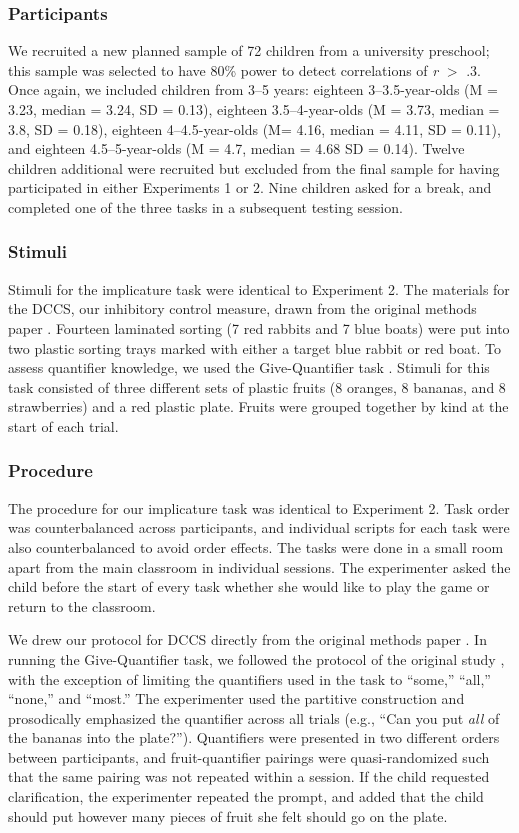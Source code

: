 \documentclass[man]{apa2}
\begin{document}
\subsubsection{Participants} We recruited a new planned sample of 72 children from a university preschool; this sample was selected to have 80\% power to detect correlations of \emph{r} $>$ .3. Once again, we included children from 3--5 years: eighteen 3--3.5-year-olds (M = 3.23, median = 3.24, SD = 0.13), eighteen 3.5--4-year-olds (M = 3.73, median = 3.8, SD = 0.18), eighteen 4--4.5-year-olds (M= 4.16, median = 4.11, SD = 0.11), and eighteen 4.5--5-year-olds (M = 4.7, median = 4.68 SD = 0.14). Twelve children additional were recruited but excluded from the final sample for having participated in either Experiments 1 or 2. Nine children asked for a break, and completed one of the three tasks in a subsequent testing session. 

\subsubsection{Stimuli} Stimuli for the implicature task were identical to Experiment 2. The materials for the DCCS, our inhibitory control measure, drawn from the original methods paper \cite{zelazo2006}. Fourteen laminated sorting (7 red rabbits and 7 blue boats) were put into two plastic sorting trays marked with either a target blue rabbit or red boat. To assess quantifier knowledge, we used the Give-Quantifier task \cite{barner2009}. Stimuli for this task consisted of three different sets of plastic fruits (8 oranges, 8 bananas, and 8 strawberries) and a red plastic plate. Fruits were grouped together by kind at the start of each trial. 

\subsubsection{Procedure}
The procedure for our implicature task was identical to Experiment 2. Task order was counterbalanced across participants, and individual scripts for each task were also counterbalanced to avoid order effects. The tasks were done in a small room apart from the main classroom in individual sessions. The experimenter asked the child before the start of every task whether she would like to play the game or return to the classroom. 

We drew our protocol for DCCS directly from the original methods paper \cite{zelazo2006}. In running the Give-Quantifier task, we followed the protocol of the original study \cite{barner2009}, with the exception of limiting the quantifiers used in the task to ``some,'' ``all,'' ``none,'' and ``most.'' The experimenter used the partitive construction and prosodically emphasized the quantifier across all trials (e.g., ``Can you put \textit{all} of the bananas into the plate?''). Quantifiers were presented in two different orders between participants, and fruit-quantifier pairings were quasi-randomized such that the same pairing was not repeated within a session. If the child requested clarification, the experimenter repeated the prompt, and added that the child should put however many pieces of fruit she felt should go on the plate. 
\end{document}
